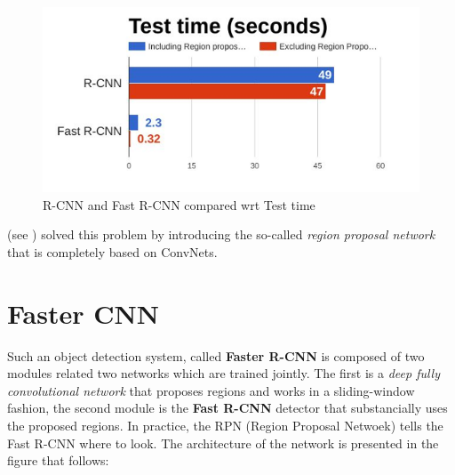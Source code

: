 \begin{figure}
    \centering
    \includegraphics[scale=0.7]{img/FRCNN_histogram.png}
    \caption{R-CNN and Fast R-CNN compared wrt Test time}
\end{figure}

\citeauthor{DBLP:journals/corr/RenHG015} (see \cite{DBLP:journals/corr/RenHG015}) solved this problem by introducing the so-called \textit{region proposal network} that is completely based on ConvNets.

\section{Faster CNN}
Such an object detection system, called \textbf{Faster R-CNN} is composed of two modules related two networks which are trained jointly. The first is a \textit{deep fully convolutional network} that proposes regions and works in a sliding-window fashion, the second module is the \textbf{Fast R-CNN} detector that substancially uses the proposed regions. In practice, the RPN (Region Proposal Netwoek) tells the Fast R-CNN where to look. The architecture of the network is presented in the figure that follows: 

